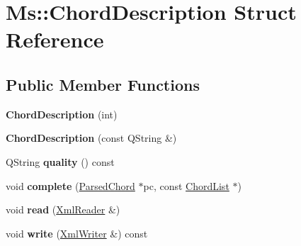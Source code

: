 \hypertarget{struct_ms_1_1_chord_description}{}\section{Ms\+:\+:Chord\+Description Struct Reference}
\label{struct_ms_1_1_chord_description}
\subsection*{Public Member Functions}
\begin{DoxyCompactItemize}
\item 
\mbox{\label{struct_ms_1_1_chord_description_ad74fdc1f8c361908bbf3e9aa6c9994c5}} 
{\bfseries Chord\+Description} (int)
\item 
\mbox{\label{struct_ms_1_1_chord_description_af7f0cfc1f87cdb0ebd7a0188b1672ee0}} 
{\bfseries Chord\+Description} (const Q\+String \&)
\item 
\mbox{\label{struct_ms_1_1_chord_description_aa5c917c41f124d3946a55af365a33dab}} 
Q\+String {\bfseries quality} () const
\item 
\mbox{\label{struct_ms_1_1_chord_description_aa238d2ad3173579e5d1509b2f35d1646}} 
void {\bfseries complete} (\hyperlink{class_ms_1_1_parsed_chord}{Parsed\+Chord} $\ast$pc, const \hyperlink{class_ms_1_1_chord_list}{Chord\+List} $\ast$)
\item 
\mbox{\label{struct_ms_1_1_chord_description_a7e64c4b0b909ef5c00454824cb9df64e}} 
void {\bfseries read} (\hyperlink{class_ms_1_1_xml_reader}{Xml\+Reader} \&)
\item 
\mbox{\label{struct_ms_1_1_chord_description_adf821ddd0032f77e97f410e146e65909}} 
void {\bfseries write} (\hyperlink{class_ms_1_1_xml_writer}{Xml\+Writer} \&) const
\end{DoxyCompactItemize}
